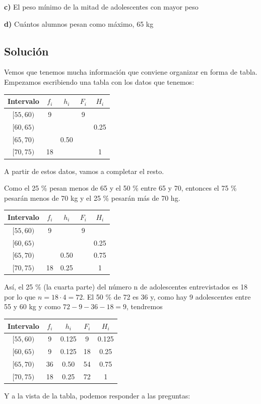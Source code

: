 \documentclass[
]{book}
\begin{document}
\textbf{c)} El peso mínimo de la mitad de adolescentes con mayor peso

\textbf{d) } Cuántos alumnos pesan como máximo, 65 kg

\hypertarget{soluciuxf3n-1}{%
\subsection{Solución}\label{soluciuxf3n-1}}

Vemos que tenemos mucha información que conviene organizar en forma de tabla. Empezamos escribiendo una tabla con los datos que tenemos:

\begin{longtable}[]{@{}ccccc@{}}
\toprule
Intervalo & \(f_i\) & \(h_i\) & \(F_i\) & \(H_i\)\tabularnewline
\midrule
\endhead
\([55,60)\) & 9 & & 9 &\tabularnewline
\([60,65)\) & & & & 0.25\tabularnewline
\([65,70)\) & & 0.50 & &\tabularnewline
\([70,75)\) & 18 & & & 1\tabularnewline
\bottomrule
\end{longtable}

A partir de estos datos, vamos a completar el resto.

Como el 25 \% pesan menos de 65 y el 50 \% entre 65 y 70, entonces el 75 \% pesarán menos de 70 kg y el 25 \% pesarán más de 70 hg.

\begin{longtable}[]{@{}ccccc@{}}
\toprule
Intervalo & \(f_i\) & \(h_i\) & \(F_i\) & \(H_i\)\tabularnewline
\midrule
\endhead
\([55,60)\) & 9 & & 9 &\tabularnewline
\([60,65)\) & & & & 0.25\tabularnewline
\([65,70)\) & & 0.50 & & 0.75\tabularnewline
\([70,75)\) & 18 & 0.25 & & 1\tabularnewline
\bottomrule
\end{longtable}

Así, el 25 \% (la cuarta parte) del número n de adolescentes entrevistados es 18 por lo que \(n = 18 \cdot 4 = 72\). El 50 \% de 72 es 36 y, como hay 9 adolescentes entre 55 y 60 kg y como \(72 - 9 - 36 - 18 = 9\), tendremos

\begin{longtable}[]{@{}ccccc@{}}
\toprule
Intervalo & \(f_i\) & \(h_i\) & \(F_i\) & \(H_i\)\tabularnewline
\midrule
\endhead
\([55,60)\) & 9 & 0.125 & 9 & 0.125\tabularnewline
\([60,65)\) & 9 & 0.125 & 18 & 0.25\tabularnewline
\([65,70)\) & 36 & 0.50 & 54 & 0.75\tabularnewline
\([70,75)\) & 18 & 0.25 & 72 & 1\tabularnewline
\bottomrule
\end{longtable}

Y a la vista de la tabla, podemos responder a las preguntas:
\end{document}
